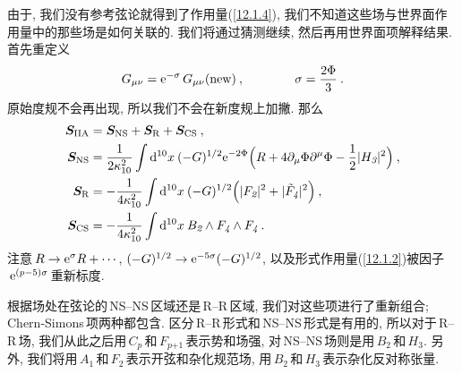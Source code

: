 由于, 我们没有参考弦论就得到了作用量(\ref{12.1.4}), 我们不知道这些场与世界面作用量中的那些场是如何关联的. 我们将通过猜测继续, 然后再用世界面项解释结果. 首先重定义
\begin{equation}
    G_{\mu\nu}=\mathrm{e}^{-\sigma}\,G_{\mu\nu}(\text{new})\:, \qquad \qquad \sigma=\frac{2\Phi}{3}\:.\label{12.1.9}
\end{equation}
原始度规不会再出现, 所以我们不会在新度规上加撇. 那么
\begin{subequations}
    \begin{align}
        \bm{S}_{\text{IIA}} &= \bm{S}_{\text{NS}}+ \bm{S}_{\text{R}}+\bm{S}_{\text{CS}} \:, \label{12.1.10a} \\
        \bm{S}_{\text{NS}} &= \frac{1}{2\kappa_{10}^{2}}\int \mathrm{d}^{10}x\:(-G)^{1/2}\mathrm{e}^{-2\Phi}\Bigl(R+4\partial_{\mu}\Phi\partial^{\mu}\Phi-\frac{1}{2}\lvert H_{\textit{3}}\rvert^{2} \Bigr) \:,  \label{12.1.10b} \\
        \bm{S}_{\text{R}}&=-\frac{1}{4\kappa_{10}^{2}}\int\mathrm{d}^{10}x\:(-G)^{1/2}\Bigl(\lvert F_{\textit{2}}\rvert^{2}+\lvert \tilde{F}_{\textit{4}}\rvert^{2}\Bigr) \:, \label{12.1.10c}\\
        \bm{S}_{\text{CS}}&=-\frac{1}{4\kappa_{10}^{2}}\int\mathrm{d}^{10}x\:B_{\textit{2}}\wedge
        F_{\textit{4}}\wedge F_{\textit{4}} \:. \label{12.1.10d}
    \end{align} \label{12.1.10}
\end{subequations}
注意$\,R\to \mathrm{e}^{\sigma}R+\cdots$, $(-G)^{1/2}\to \mathrm{e}^{-5\sigma}(-G)^{1/2}$, 以及形式作用量(\ref{12.1.2})被因子$\, \mathrm{e}^{(p-5)\sigma}\,$重新标度.

根据场处在弦论的\,NS--NS\,区域还是\,R--R\,区域, 我们对这些项进行了重新组合; Chern-Simons\,项两种都包含. 区分\,R--R\,形式和\,NS--NS\,形式是有用的, 所以对于\,R--R\,场, 我们从此之后用$\,C_{\textit{p}}\,$和$\,F_{\textit{p+1}}\,$表示势和场强, 对\,NS--NS\,场则是用$\,B_{\textit{2}}\,$和$\,H_{\textit{3}}$. 另外, 我们将用$\,A_{\textit{1}}\,$和$\,F_{\textit{2}}\,$表示开弦和杂化规范场, 用$\,B_{\textit{2}}\,$和$\,H_{\textit{3}}\,$表示杂化反对称张量.

